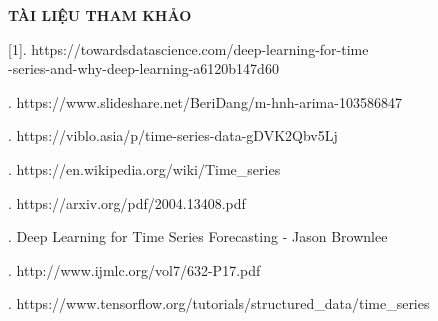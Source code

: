 \newpage
\changefontsizes{16pt}
\centerline{\textbf{TÀI LIỆU THAM KHẢO}}

\bigskip
\bigskip
\changefontsizes{13pt}
\setlength{\parindent}{0cm}
[1]. https://towardsdatascience.com/deep-learning-for-time\\-series-and-why-deep-learning-a6120b147d60

\smallskip
[2]. 
https://www.slideshare.net/BeriDang/m-hnh-arima-103586847

\smallskip
[3].
https://viblo.asia/p/time-series-data-gDVK2Qbv5Lj

\smallskip
[4].
https://en.wikipedia.org/wiki/Time\_series

\smallskip
[5].
https://arxiv.org/pdf/2004.13408.pdf

\smallskip
[6].
Deep Learning for Time Series Forecasting - Jason Brownlee

\smallskip
[7].
http://www.ijmlc.org/vol7/632-P17.pdf

\smallskip
[8].
https://www.tensorflow.org/tutorials/structured\_data/time\_series



